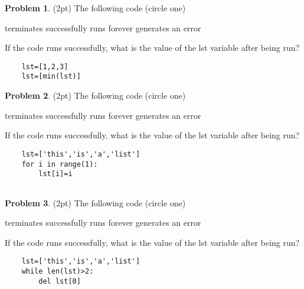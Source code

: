 \documentclass[10pt]{article}
\theoremstyle{definition}
\newtheorem{problem}{Problem}
\begin{document}
\begin{problem}
    (2pt)
    The following code (circle one)
    
    \vspace{0.25in}
    \hspace{0.5in}terminates successfully
    \hspace{1in}runs forever
    \hspace{1in}generates an error
    \vspace{0.25in}

    \noindent
    If the code runs successfully, what is the value of the lst variable after being run?
\end{problem}
\begin{lstlisting}
    lst=[1,2,3]
    lst=[min(lst)]
\end{lstlisting}
\vspace{2in}
\newpage
\begin{problem}
    (2pt)
    The following code (circle one)
    
    \vspace{0.25in}
    \hspace{0.5in}terminates successfully
    \hspace{1in}runs forever
    \hspace{1in}generates an error
    \vspace{0.25in}

    \noindent
    If the code runs successfully, what is the value of the lst variable after being run?
\end{problem}
\begin{lstlisting}
    lst=['this','is','a','list']
    for i in range(1):
        lst[i]=i
        
\end{lstlisting}
\vspace{3.5in}

\begin{problem}
    (2pt)
    The following code (circle one)
    
    \vspace{0.25in}
    \hspace{0.5in}terminates successfully
    \hspace{1in}runs forever
    \hspace{1in}generates an error
    \vspace{0.25in}

    \noindent
    If the code runs successfully, what is the value of the lst variable after being run?
\end{problem}
\begin{lstlisting}
    lst=['this','is','a','list']
    while len(lst)>2:
        del lst[0]
\end{lstlisting}
\vspace{1.5in}
\end{document}
